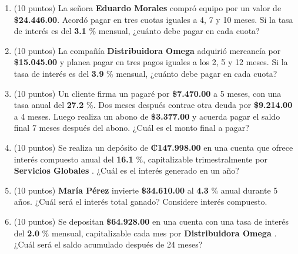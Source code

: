 \documentclass[10pt]{article}
\begin{document}
\begin{enumerate}[leftmargin=*, label=\textbf{\arabic*.}]
  \item (10 puntos) La señora \textbf{ Eduardo Morales } compró equipo por un valor de \textbf{\$\num{ 24,446.00 }}. Acordó pagar en tres cuotas iguales a 4, 7 y 10 meses. Si la tasa de interés es del \textbf{ 3.1 }\% mensual, ¿cuánto debe pagar en cada cuota?

  \vspace{0.5cm}

  \item (10 puntos) La compañía \textbf{ Distribuidora Omega } adquirió mercancía por \textbf{\$\num{ 15,045.00 }} y planea pagar en tres pagos iguales a los 2, 5 y 12 meses. Si la tasa de interés es del \textbf{ 3.9 }\% mensual, ¿cuánto debe pagar en cada cuota?

  \vspace{0.5cm}

  \item (10 puntos) Un cliente firma un pagaré por \textbf{\$\num{ 7,470.00 }} a 5 meses, con una tasa anual del \textbf{ 27.2 }\%. Dos meses después contrae otra deuda por \textbf{\$\num{ 9,214.00 }} a 4 meses. Luego realiza un abono de \textbf{\$\num{ 3,377.00 }} y acuerda pagar el saldo final 7 meses después del abono. ¿Cuál es el monto final a pagar?

  \vspace{0.5cm}

  \item (10 puntos) Se realiza un depósito de \textbf{₡\num{ 147.998.00 }} en una cuenta que ofrece interés compuesto anual del \textbf{ 16.1 }\%, capitalizable trimestralmente por \textbf{ Servicios Globales }. ¿Cuál es el interés generado en un año?

  \vspace{0.5cm}

  \item (10 puntos) \textbf{ María Pérez } invierte \textbf{\$\num{ 34,610.00 }} al \textbf{ 4.3 }\% anual durante 5 años. ¿Cuál será el interés total ganado? Considere interés compuesto.

  \vspace{0.5cm}

  \item (10 puntos) Se depositan \textbf{\$\num{ 64,928.00 }} en una cuenta con una tasa de interés del \textbf{ 2.0 }\% mensual, capitalizable cada mes por \textbf{ Distribuidora Omega }. ¿Cuál será el saldo acumulado después de 24 meses?
\end{enumerate}
\end{document}
